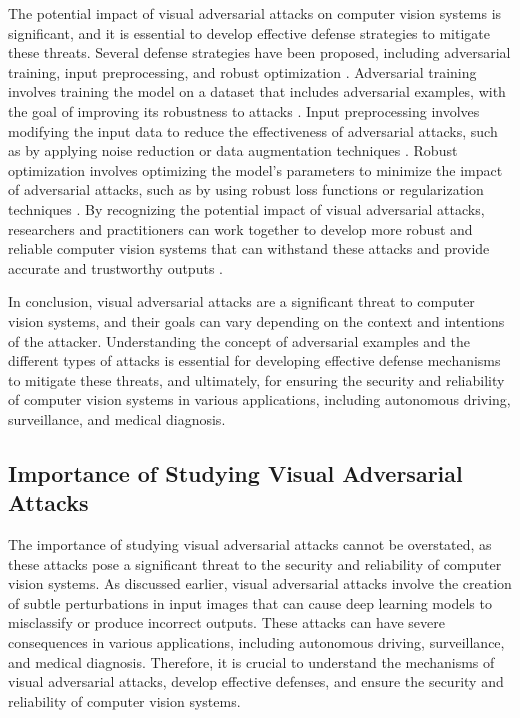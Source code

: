 \documentclass[11pt]{article}
\begin{document}
The potential impact of visual adversarial attacks on computer vision systems is significant, and it is essential to develop effective defense strategies to mitigate these threats. Several defense strategies have been proposed, including adversarial training, input preprocessing, and robust optimization \cite{ref8}. Adversarial training involves training the model on a dataset that includes adversarial examples, with the goal of improving its robustness to attacks \cite{ref9}. Input preprocessing involves modifying the input data to reduce the effectiveness of adversarial attacks, such as by applying noise reduction or data augmentation techniques \cite{ref10}. Robust optimization involves optimizing the model's parameters to minimize the impact of adversarial attacks, such as by using robust loss functions or regularization techniques \cite{ref11}. By recognizing the potential impact of visual adversarial attacks, researchers and practitioners can work together to develop more robust and reliable computer vision systems that can withstand these attacks and provide accurate and trustworthy outputs \cite{ref12}.

In conclusion, visual adversarial attacks are a significant threat to computer vision systems, and their goals can vary depending on the context and intentions of the attacker. Understanding the concept of adversarial examples and the different types of attacks is essential for developing effective defense mechanisms to mitigate these threats, and ultimately, for ensuring the security and reliability of computer vision systems in various applications, including autonomous driving, surveillance, and medical diagnosis.

\subsection{Importance of Studying Visual Adversarial Attacks}

The importance of studying visual adversarial attacks cannot be overstated, as these attacks pose a significant threat to the security and reliability of computer vision systems. As discussed earlier, visual adversarial attacks involve the creation of subtle perturbations in input images that can cause deep learning models to misclassify or produce incorrect outputs. These attacks can have severe consequences in various applications, including autonomous driving, surveillance, and medical diagnosis. Therefore, it is crucial to understand the mechanisms of visual adversarial attacks, develop effective defenses, and ensure the security and reliability of computer vision systems.
\end{document}
